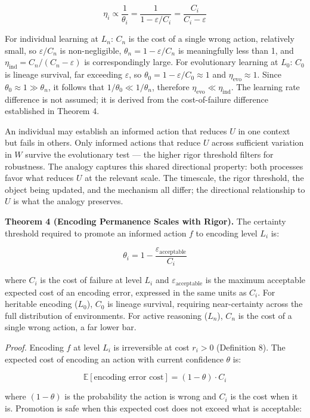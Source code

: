 \documentclass[
]{article}
\begin{document}
\[\eta_i \propto \frac{1}{\theta_i} = \frac{1}{1 - \varepsilon/C_i} = \frac{C_i}{C_i - \varepsilon}\]

For individual learning at \(L_n\): \(C_n\) is the cost of a single
wrong action, relatively small, so \(\varepsilon/C_n\) is
non-negligible, \(\theta_n = 1 - \varepsilon/C_n\) is meaningfully less
than 1, and \(\eta_{\text{ind}} = C_n/(C_n - \varepsilon)\) is
correspondingly large. For evolutionary learning at \(L_0\): \(C_0\) is
lineage survival, far exceeding \(\varepsilon\), so
\(\theta_0 = 1 - \varepsilon/C_0 \approx 1\) and
\(\eta_{\text{evo}} \approx 1\). Since
\(\theta_0 \approx 1 \gg \theta_n\), it follows that
\(1/\theta_0 \ll 1/\theta_n\), therefore
\(\eta_{\text{evo}} \ll \eta_{\text{ind}}\). The learning rate
difference is not assumed; it is derived from the cost-of-failure
difference established in Theorem 4.

An individual may establish an informed action that reduces \(U\) in one
context but fails in others. Only informed actions that reduce \(U\)
across sufficient variation in \(W\) survive the evolutionary test ---
the higher rigor threshold filters for robustness. The analogy captures
this shared directional property: both processes favor what reduces
\(U\) at the relevant scale. The timescale, the rigor threshold, the
object being updated, and the mechanism all differ; the directional
relationship to \(U\) is what the analogy preserves.

\textbf{Theorem 4 (Encoding Permanence Scales with Rigor).} The
certainty threshold required to promote an informed action \(f\) to
encoding level \(L_i\) is:

\[\theta_i = 1 - \frac{\varepsilon_{\text{acceptable}}}{C_i}\]

where \(C_i\) is the cost of failure at level \(L_i\) and
\(\varepsilon_{\text{acceptable}}\) is the maximum acceptable expected
cost of an encoding error, expressed in the same units as \(C_i\). For
heritable encoding (\(L_0\)), \(C_0\) is lineage survival, requiring
near-certainty across the full distribution of environments. For active
reasoning (\(L_n\)), \(C_n\) is the cost of a single wrong action, a far
lower bar.

\emph{Proof.} Encoding \(f\) at level \(L_i\) is irreversible at cost
\(r_i > 0\) (Definition 8). The expected cost of encoding an action with
current confidence \(\theta\) is:

\[\mathbb{E}[\text{encoding error cost}] = (1 - \theta) \cdot C_i\]

where \((1-\theta)\) is the probability the action is wrong and \(C_i\)
is the cost when it is. Promotion is safe when this expected cost does
not exceed what is acceptable:
\end{document}
